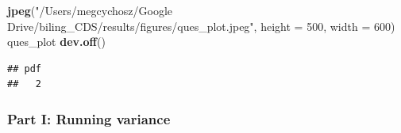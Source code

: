 \documentclass[
]{article}
\newenvironment{Shaded}{\begin{snugshade}}{\end{snugshade}}
\newcommand{\DataTypeTok}[1]{\textcolor[rgb]{0.13,0.29,0.53}{#1}}
\newcommand{\DecValTok}[1]{\textcolor[rgb]{0.00,0.00,0.81}{#1}}
\newcommand{\KeywordTok}[1]{\textcolor[rgb]{0.13,0.29,0.53}{\textbf{#1}}}
\newcommand{\NormalTok}[1]{#1}
\newcommand{\StringTok}[1]{\textcolor[rgb]{0.31,0.60,0.02}{#1}}
\begin{document}
\begin{Shaded}
\begin{Highlighting}[]
\KeywordTok{jpeg}\NormalTok{(}\StringTok{"/Users/megcychosz/Google Drive/biling_CDS/results/figures/ques_plot.jpeg"}\NormalTok{, }\DataTypeTok{height =} \DecValTok{500}\NormalTok{, }\DataTypeTok{width =} \DecValTok{600}\NormalTok{)}
\NormalTok{ques_plot}
\KeywordTok{dev.off}\NormalTok{()}
\end{Highlighting}
\end{Shaded}

\begin{verbatim}
## pdf 
##   2
\end{verbatim}

\hypertarget{part-i-running-variance}{%
\subsubsection{Part I: Running variance}\label{part-i-running-variance}}
\end{document}
